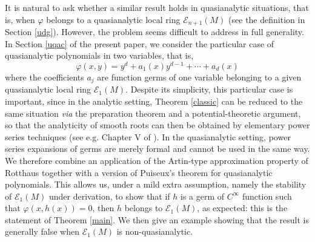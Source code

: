 \documentclass[a4paper]{amsart}
\theoremstyle{plain}
\theoremstyle{remark}
\begin{document}
It is natural to ask whether a similar result holds in quasianalytic  situations, that is, when $ \varphi $ belongs to a quasianalytic local ring $ \mathcal{E}_{n+1}(M) $ (see the definition in Section \ref{udg}). However, the problem seems difficult to address in full generality. In Section \ref{uqac} of the present paper, we consider the particular case of quasianalytic polynomials in two variables, that is,
\begin{equation*}
\varphi(x,y)=y^d+a_1(x)y^{d-1}+\cdots+a_d(x)
\end{equation*}
where the coefficients $ a_j $ are function germs of one variable belonging to a given quasianalytic local ring $ \mathcal{E}_1(M) $. 
Despite its simplicity, this particular case is important, since in the analytic setting, Theorem \ref{classic} can be reduced to the same situation \emph{via} the preparation theorem and a potential-theoretic argument, so that the analyticity of smooth roots can then be obtained by elementary power series techniques (see e.g. Chapter V of \cite{Ba}). In the quasianalytic setting, power series expansions of germs are merely formal and cannot be used in the same way. We therefore combine an application of the Artin-type approximation property of Rotthaus \cite{Ro} together with a version of Puiseux's theorem for quasianalytic polynomials. This allows us, under a mild extra assumption, namely the stability of $ \mathcal{E}_1(M) $  under derivation, to show that if $ h $ is a germ of $ C^\infty $ function such that $ \varphi(x,h(x))=0 $, then $ h $ belongs to $ \mathcal{E}_1(M) $, as expected: this is the statement of Theorem \ref{main}. We then give an example showing that the result is generally false when $ \mathcal{E}_1(M) $ is non-quasianalytic. 
\end{document}
